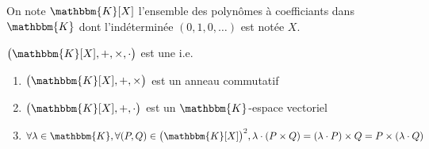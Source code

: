 \begin{rmk}
	[Notation]
	On note $\mathbbm{K}[X]$ l'ensemble des polynômes à coefficiants dans $\mathbbm{K}$ dont l'indéterminée $(0, 1, 0, \ldots)$ est notée $X$.
\end{rmk}

\begin{prop}
	$\big(\mathbbm{K}[X],+,\times,\cdot\big)$ est une  i.e.
	\begin{enumerate}
		\item $\big(\mathbbm{K}[X], +, \times\big)$ est un anneau commutatif
		\item $\big(\mathbbm{K}[X], +, \cdot\big)$ est un $\mathbbm{K}$-espace vectoriel
		\item $\forall \lambda \in \mathbbm{K}, \forall (P,Q) \in \big(\mathbbm{K}[X]\big)^2, \lambda \cdot (P \times Q) = (\lambda \cdot P) \times Q = P \times (\lambda \cdot Q)$
	\end{enumerate}
\end{prop}

